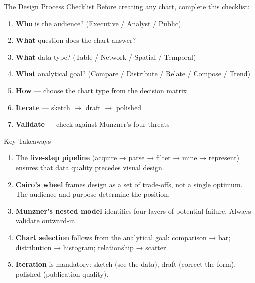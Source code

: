 \documentclass[10pt]{beamer}
\begin{document}
\begin{frame}{The Design Process Checklist}
  Before creating any chart, complete this checklist:
  \begin{enumerate}
    \item \textbf{Who} is the audience? (Executive / Analyst / Public)
    \item \textbf{What} question does the chart answer?
    \item \textbf{What} data type? (Table / Network / Spatial / Temporal)
    \item \textbf{What} analytical goal? (Compare / Distribute / Relate /
          Compose / Trend)
    \item \textbf{How} --- choose the chart type from the decision matrix
    \item \textbf{Iterate} --- sketch $\rightarrow$ draft $\rightarrow$ polished
    \item \textbf{Validate} --- check against Munzner's four threats
  \end{enumerate}
\end{frame}

\begin{frame}{Key Takeaways}
  \begin{enumerate}
    \item The \textbf{five-step pipeline} (acquire → parse → filter → mine
          → represent) ensures that data quality precedes visual design.
    \item \textbf{Cairo's wheel} frames design as a set of trade-offs, not
          a single optimum. The audience and purpose determine the position.
    \item \textbf{Munzner's nested model} identifies four layers of
          potential failure. Always validate outward-in.
    \item \textbf{Chart selection} follows from the analytical goal:
          comparison → bar; distribution → histogram; relationship → scatter.
    \item \textbf{Iteration} is mandatory: sketch (see the data), draft
          (correct the form), polished (publication quality).
  \end{enumerate}
\end{frame}
\end{document}
